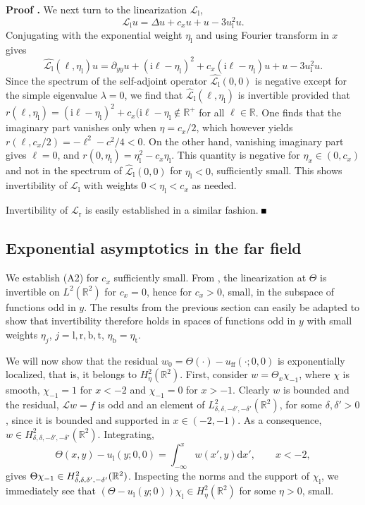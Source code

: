 \documentclass[10pt]{article}
\newenvironment{Proof}[1][\unskip]%
 {\begin{trivlist} \item[]{\bf Proof #1. }}%
 {\hspace*{\fill}$\rule{.4\baselineskip}{.4\baselineskip}$\end{trivlist}}
\newcommand{\R}{\mathbb{R}}
\newcommand{\rmd}{\mathrm{d}}
\newcommand{\rmi}{\mathrm{i}}
\begin{document}
\begin{Proof}
We next turn to the linearization $\mathscr{L}_\mathrm{l}$,
\[
\mathscr{L}_\mathrm{l}u=\Delta u + c_x u +u-3u_\mathrm{l}^2u.
\]
Conjugating with the exponential weight $\eta_\mathrm{l}$ and using Fourier transform in $x$ gives 
\[
\widehat{\mathscr{L}_\mathrm{l}}(\ell,\eta_\mathrm{l})u=\partial_{yy} u +(\rmi\ell-\eta_\mathrm{l})^2 +  c_x (\rmi \ell -\eta_\mathrm{l}) u +u-3u_\mathrm{l}^2u.
\]
Since the spectrum of the self-adjoint operator $\widehat{\mathscr{L}_\mathrm{l}}(0,0)$ is negative except for the simple eigenvalue $\lambda=0$, we find that $\widehat{\mathscr{L}}_\mathrm{l}(\ell,\eta_\mathrm{l})$ is invertible provided that $r(\ell,\eta_\mathrm{l})=(\rmi\ell-\eta_\mathrm{l})^2+c_x(\rmi\ell-\eta_\mathrm{l}\not\in \R^+$ for all $\ell\in\R$. One finds that the imaginary part vanishes only when $\eta=c_x/2$, which however yields $r(\ell,c_x/2)=-\ell^2-c^2/4<0$. On the other hand, vanishing imaginary part gives $\ell=0$, and $r(0,\eta_\mathrm{l})=\eta_\mathrm{l}^2-c_x\eta_\mathrm{l}$. This quantity is negative for $\eta_x\in (0,c_x)$ and not in the spectrum of $\widehat{\mathscr{L}}_\mathrm{l}(0,0)$ for $\eta_\mathrm{l}<0$, sufficiently small. This shows invertibility of $\mathscr{L}_\mathrm{l}$ with weights $0<\eta_\mathrm{l}<c_x$ as needed. 

Invertibility of $\mathscr{L}_\mathrm{r}$ is easily established in a similar fashion. 
 \end{Proof}




\subsection{Exponential asymptotics in the far field}\label{s:3.2}

We establish (A2) for $c_x$ sufficiently small. From \cite{Monteiro_Scheel}, the linearization at $\Theta$ is invertible on $L^2(\R^2)$ for $c_x=0$, hence for $c_x>0$, small, in the subspace of functions odd in $y$. The results from the previous section can easily be adapted to show that invertibility therefore holds in spaces of functions odd in $y$ with small weights $\eta_j$, $j=\mathrm{l,r,b,t}$, $\eta_\mathrm{b}=\eta_\mathrm{t}$. 

We will now show that the residual $w_0=\Theta(\cdot)-u_\mathrm{ff}(\cdot;0,0)$ is exponentially localized, that is, it belongs to $H^2_\eta(\R^2)$. 
First, consider $w=\Theta_x\chi_{-1}$, where $\chi$ is smooth, $\chi_{-1}=1$ for $x<-2$ and $\chi_{-1}=0$ for $x>-1$. Clearly $w$ is bounded and the residual, $\mathscr{L}w=f$ is odd and an element of $L^2_{\delta,\delta,-\delta',-\delta'}(\R^2)$, for some $\delta,\delta'>0$, since it is bounded and supported in $x\in (-2,-1)$. As a consequence, $w\in H^2_{\delta,\delta,-\delta',-\delta'}(\R^2)$. Integrating,
\[
\Theta(x,y)-u_\mathrm{l}(y;0,0)=\int_{-\infty}^x w(x',y)\rmd x',\qquad x<-2,
\]
gives $\Theta\chi_{-1}\in H^2_{\delta,\delta,\-\delta',-\delta'}(\R^2)$. Inspecting the norms and the support of $\chi_\mathrm{l}$, we immediately see that $(\Theta-u_\mathrm{l}(y;0))\chi_\mathrm{l}\in H^2_\eta(\R^2)$ for some $\eta>0$, small. 
\end{document}
